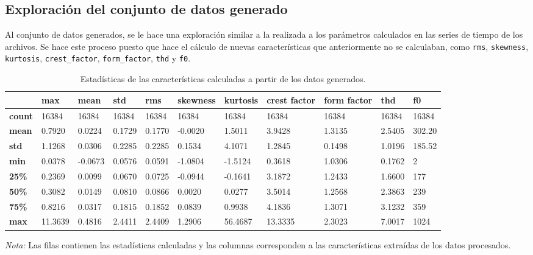 \documentclass[11pt,a4paper,spanish]{book}
\numberwithin{equation}{chapter}
\numberwithin{figure}{chapter}
\begin{document}
\subsection{Exploración del conjunto de datos generado}

Al conjunto de datos generados, se le hace una exploración similar a la realizada 
a los parámetros calculados en las series de tiempo de los archivos. 
Se hace este proceso puesto que hace el cálculo de nuevas características que 
anteriormente no se calculaban, como \texttt{rms}, \texttt{skewness}, \texttt{kurtosis}, 
\texttt{crest\_factor}, \texttt{form\_factor}, \texttt{thd} y \texttt{f0}. 


\begin{table}[h]
\caption{Estadísticas de las características calculadas a partir de los datos generados.}
\centering
\renewcommand{\arraystretch}{1.2}
\scriptsize
\begin{tabularx}{\textwidth}{|l|X|X|X|X|X|X|X|X|X|X|}
    \hline
    \textbf{} & 
    \textbf{max} & 
    \textbf{mean} & 
    \textbf{std} & 
    \textbf{rms} & 
    \textbf{skewness} & 
    \textbf{kurtosis} & 
    \textbf{crest factor} & 
    \textbf{form factor} & 
    \textbf{thd} & 
    \textbf{f0} \\
    \hline
    \textbf{count} & 16384 & 16384 & 16384 & 16384 & 16384 & 16384 & 16384 & 16384 & 16384 & 16384 \\
    \hline
    \textbf{mean} & 0.7920 & 0.0224 & 0.1729 & 0.1770 & -0.0020 & 1.5011 & 3.9428 & 1.3135 & 2.5405 & 302.20 \\
    \hline
    \textbf{std} & 1.1268 & 0.0306 & 0.2285 & 0.2285 & 0.1534 & 4.1071 & 1.2845 & 0.1498 & 1.0196 & 185.52 \\
    \hline
    \textbf{min} & 0.0378 & -0.0673 & 0.0576 & 0.0591 & -1.0804 & -1.5124 & 0.3618 & 1.0306 & 0.1762 & 2 \\
    \hline
    \textbf{25\%} & 0.2369 & 0.0099 & 0.0670 & 0.0725 & -0.0944 & -0.1641 & 3.1872 & 1.2433 & 1.6600 & 177 \\
    \hline
    \textbf{50\%} & 0.3082 & 0.0149 & 0.0810 & 0.0866 & 0.0020 & 0.0277 & 3.5014 & 1.2568 & 2.3863 & 239 \\
    \hline
    \textbf{75\%} & 0.8216 & 0.0317 & 0.1815 & 0.1852 & 0.0839 & 0.9938 & 4.1836 & 1.3071 & 3.1232 & 359 \\
    \hline
    \textbf{max} & 11.3639 & 0.4816 & 2.4411 & 2.4409 & 1.2906 & 56.4687 & 13.3335 & 2.3023 & 7.0017 & 1024 \\
    \hline
\end{tabularx}
\label{tab:stats_features}
\vspace{2mm}
\parbox{\textwidth}{\scriptsize \textit{Nota:} Las filas contienen las estadísticas calculadas 
y las columnas corresponden a las características extraídas de los datos procesados.}
\end{table}
\end{document}
